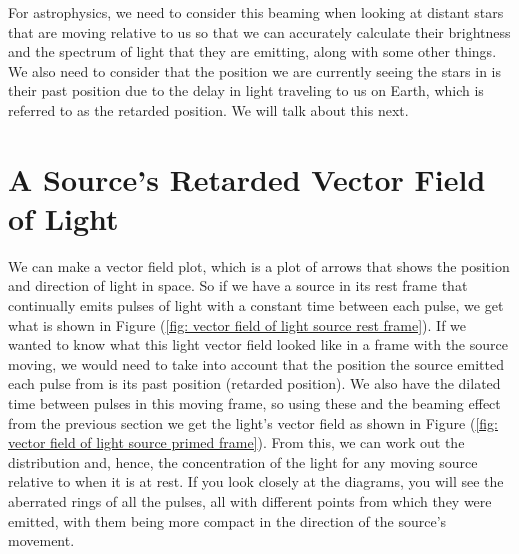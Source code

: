 %

For astrophysics, we need to consider this beaming when looking at distant stars that are moving relative to us so that we can accurately calculate their brightness and the spectrum of light that they are emitting, along with some other things.
We also need to consider that the position we are currently seeing the stars in is their past position due to the delay in light traveling to us on Earth, which is referred to as the retarded position.
We will talk about this next.

\section{A Source's Retarded Vector Field of Light} \label{sect: Retarded Field}

We can make a vector field plot, which is a plot of arrows that shows the position and direction of light in space.
So if we have a source in its rest frame that continually emits pulses of light with a constant time between each pulse, we get what is shown in Figure (\ref{fig: vector field of light source rest frame}).
If we wanted to know what this light vector field looked like in a frame with the source moving, we would need to take into account that the position the source emitted each pulse from is its past position (retarded position).
We also have the dilated time between pulses in this moving frame, so using these and the beaming effect from the previous section we get the light's vector field as shown in Figure (\ref{fig: vector field of light source primed frame}).
From this, we can work out the distribution and, hence, the concentration of the light for any moving source relative to when it is at rest.
If you look closely at the diagrams, you will see the aberrated rings of all the pulses, all with different points from which they were emitted, with them being more compact in the direction of the source's movement.

